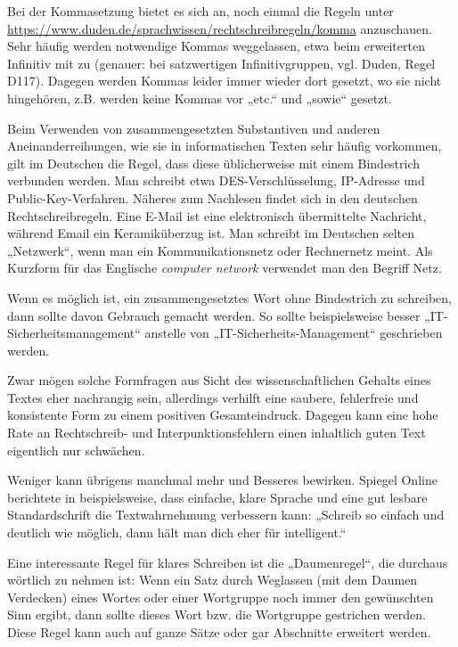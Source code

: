 \documentclass[
    fontsize=12pt,
    headings=small,
    parskip=half,           %
    bibliography=totoc,
    numbers=noenddot,       %
    open=any,               %
    ]{scrreprt}
\begin{document}
Bei der Kommasetzung bietet es sich an, noch einmal die Regeln unter \url{https://www.duden.de/sprachwissen/rechtschreibregeln/komma} anzuschauen. Sehr häufig werden notwendige Kommas weggelassen, etwa beim erweiterten Infinitiv mit zu (genauer: bei satzwertigen Infinitivgruppen, vgl. Duden, Regel D117). Dagegen werden Kommas leider immer wieder dort gesetzt, wo sie nicht hingehören, z.B. werden keine Kommas vor „etc.“ und „sowie“ gesetzt.

Beim Verwenden von zusammengesetzten Substantiven und anderen Aneinanderreihungen, wie sie in informatischen Texten sehr häufig vorkommen, gilt im Deutschen die Regel, dass diese üblicherweise mit einem Bindestrich verbunden werden. Man schreibt etwa DES-Verschlüsselung, IP-Adresse und Public-Key-Verfahren. Näheres zum Nachlesen findet sich in den deutschen Rechtschreibregeln. Eine E-Mail ist eine elektronisch übermittelte Nachricht, während Email ein Keramiküberzug ist. Man schreibt im Deutschen selten „Netzwerk“, wenn man ein Kommunikationsnetz oder Rechnernetz meint. Als Kurzform für das Englische \emph{computer network} verwendet man den Begriff Netz.

Wenn es möglich ist, ein zusammengesetztes Wort ohne Bindestrich zu schreiben, dann sollte davon Gebrauch gemacht werden. So sollte beispielsweise besser „IT-Sicherheitsmanagement“ anstelle von „IT-Sicherheits-Management“ geschrieben werden.

Zwar mögen solche Formfragen aus Sicht des wissenschaftlichen Gehalts eines Textes eher nachrangig sein, allerdings verhilft eine saubere, fehlerfreie und konsistente Form zu einem positiven Gesamteindruck. Dagegen kann eine hohe Rate an Rechtschreib- und Interpunktionsfehlern einen inhaltlich guten Text eigentlich nur schwächen. 

Weniger kann übrigens manchmal mehr und Besseres bewirken. Spiegel Online berichtete in \cite{textwahrnehmung} beispielsweise, dass einfache, klare Sprache und eine gut lesbare Standardschrift die Textwahrnehmung verbessern kann: „Schreib so einfach und deutlich wie möglich, dann hält man dich eher für intelligent.“

Eine interessante Regel für klares Schreiben ist die „Daumenregel“, die durchaus wörtlich zu nehmen ist: Wenn ein Satz durch Weglassen (mit dem Daumen Verdecken) eines Wortes oder einer Wortgruppe noch immer den gewünschten Sinn ergibt, dann sollte dieses Wort bzw. die Wortgruppe gestrichen werden. Diese Regel kann auch auf ganze Sätze oder gar Abschnitte erweitert werden.
\end{document}
